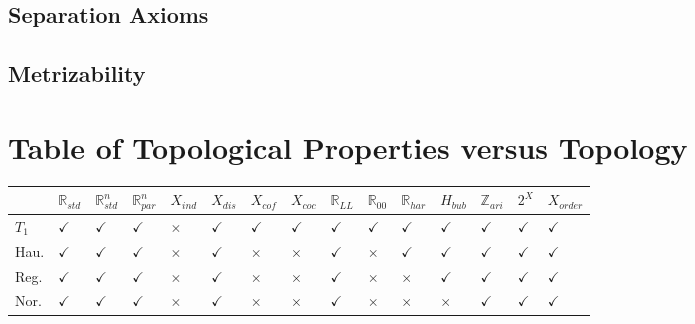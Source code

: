 \documentclass[12pt,letterpaper,reqno]{article}
\begin{document}
\subsection{Separation Axioms}

\subsection{Metrizability}

\newpage
\section{Table of Topological Properties versus Topology}

\begin{center}
\begin{table}[htp!]
\begin{tabular}{|l|l|l|l|l|l|l|l|l|l|l|l|l|l|l|}
\hline
          & $\mathbb{R}_{std}$ & $\mathbb{R}_{std}^{n}$                                                         & $\mathbb{R}_{par}^{n}$ & $X_{ind}$ & $X_{dis}$   & $X_{cof}$  & $X_{coc}$ & $\mathbb{R}_{LL}$ & $\mathbb{R}_{00}$ & $\mathbb{R}_{har}$ & $H_{bub}$    & $\mathbb{Z}_{ari}$ & $2^{X}$      & $X_{order}$  \\ \hline
$T_1$     & $\checkmark$       & $\checkmark$                                                                   & $\checkmark$           & $\times$     & $\checkmark$ & $\checkmark$ & $\checkmark$  & $\checkmark$      & $\checkmark$      & $\checkmark$       & $\checkmark$ & $\checkmark$         & $\checkmark$ & $\checkmark$ \\ \hline
Hau. & $\checkmark$       & $\checkmark$                                                                   & $\checkmark$           & $\times$     & $\checkmark$ & $\times$     & $\times$      & $\checkmark$      & $\times$          & $\checkmark$       & $\checkmark$ & $\checkmark$         & $\checkmark$ & $\checkmark$ \\ \hline
Reg.   & $\checkmark$       & $\checkmark$                                                                   & $\checkmark$           & $\times$     & $\checkmark$ & $\times$     & $\times$      & $\checkmark$      & $\times$          & $\times$           & $\checkmark$ & $\checkmark$         & $\checkmark$ & $\checkmark$ \\ \hline
Nor.    & $\checkmark$       & $\checkmark$                                                                   & $\checkmark$           & $\times$     & $\checkmark$ & $\times$     & $\times$      & $\checkmark$      & $\times$          & $\times$           & $\times$     & $\checkmark$         & $\checkmark$ & $\checkmark$ \\ \hline

\end{tabular}
\end{table}
\end{center}
\end{document}
